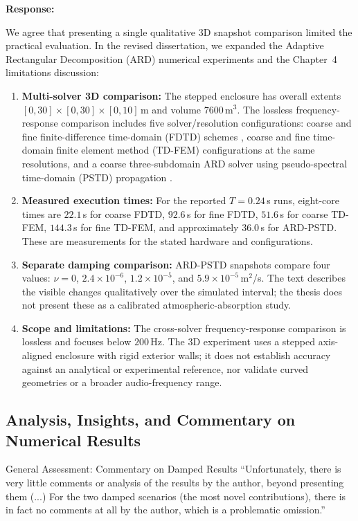 \documentclass[11pt,a4paper]{article}
\newenvironment{response}{
    \par\vspace{1mm}\noindent\textbf{\textcolor{responseframe}{Response:}}\par\vspace{1mm}
}{
    \par\vspace{3mm}
}
\begin{document}
\begin{response}
We agree that presenting a single qualitative 3D snapshot comparison limited the practical evaluation. In the revised dissertation, we expanded the Adaptive Rectangular Decomposition (ARD) numerical experiments \citep{raghuvanshi_efficient_2009} and the Chapter~4 limitations discussion:
\begin{enumerate}
    \item \textbf{Multi-solver 3D comparison:} The stepped enclosure has overall extents $[0,30]\times[0,30]\times[0,10]$\,m and volume $7600$\,m$^3$. The lossless frequency-response comparison includes five solver/resolution configurations: coarse and fine finite-difference time-domain (FDTD) schemes \citep{botteldooren_finitedifference_1995}, coarse and fine time-domain finite element method (TD-FEM) configurations at the same resolutions, and a coarse three-subdomain ARD solver using pseudo-spectral time-domain (PSTD) propagation \citep{hornikx_extended_2010}.
    \item \textbf{Measured execution times:} For the reported $T=0.24$\,s runs, eight-core times are $22.1$\,s for coarse FDTD, $92.6$\,s for fine FDTD, $51.6$\,s for coarse TD-FEM, $144.3$\,s for fine TD-FEM, and approximately $36.0$\,s for ARD-PSTD. These are measurements for the stated hardware and configurations.
    \item \textbf{Separate damping comparison:} ARD-PSTD snapshots compare four values: $\nu=0$, $2.4\times10^{-6}$, $1.2\times10^{-5}$, and $5.9\times10^{-5}$\,m$^2$/s. The text describes the visible changes qualitatively over the simulated interval; the thesis does not present these as a calibrated atmospheric-absorption study.
    \item \textbf{Scope and limitations:} The cross-solver frequency-response comparison is lossless and focuses below $200$\,Hz. The 3D experiment uses a stepped axis-aligned enclosure with rigid exterior walls; it does not establish accuracy against an analytical or experimental reference, nor validate curved geometries or a broader audio-frequency range.
\end{enumerate}
\end{response}

\subsection{Analysis, Insights, and Commentary on Numerical Results}
\begin{revcomment}{General Assessment: Commentary on Damped Results}
``Unfortunately, there is very little comments or analysis of the results by the author, beyond presenting them (...) For the two damped scenarios (the most novel contributions), there is in fact no comments at all by the author, which is a problematic omission.''
\end{revcomment}
\end{document}
